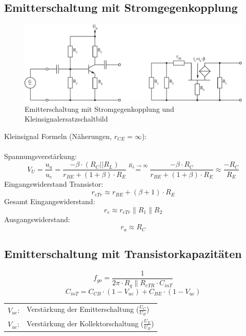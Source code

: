 \subsection{Emitterschaltung mit Stromgegenkopplung}
\begin{figure}[h!]
	\centering
	\includegraphics[width = \linewidth]{../fig/trans_emitter_stromgegen.pdf}
	\caption{Emitterschaltung mit Stromgegenkopplung und Kleinsignalersatzschaltbild}
	\label{trans:emitterschaltung_sgk}
\end{figure}
\noindent
Kleinsignal Formeln (Näherungen, $r_{CE} = \infty$):
\\\\
Spannungsverstärkung:
\[
	V_U = \frac{u_a}{u_e} = \frac{-\beta \cdot (R_C || R_L)}{r_{BE} + (1 + \beta) \cdot R_E} \stackrel{R_L \to \infty}{=} \frac{-\beta \cdot R_C}{r_{BE} + (1 + \beta) \cdot R_E} \approx \frac{-R_C}{R_E}
\]
Eingangswiderstand Transistor:
\[
	r_{eTr} \approx r_{BE} + (\beta + 1) \cdot R_E
\]
Gesamt Eingangswiderstand:
\[
	r_e \approx r_{eTr} \parallel R_1 \parallel R_2
\]
Ausgangswiderstand:
\[
	r_a \approx R_C
\]

\subsection{Emitterschaltung mit Transistorkapazitäten}
\[
	f_{go} = \frac{1}{2\pi \cdot R_q \parallel R_{eTR} \cdot C_{inT}}
\]
\[
	C_{inT} = C_{CB} \cdot (1-V_{ue}) + C_{BE} \cdot (1-V_{uc})
\]
\begin{tabular}{@{}ll}
  $V_{ue}$:	    & Verstärkung der Emitterschaltung ($\frac{U_{C}}{U_{B}}$) \\
  $V_{uc}$:	    & Verstärkung der Kollektorschaltung ($\frac{U_{E}}{U_{B}}$) \\
\end{tabular}

